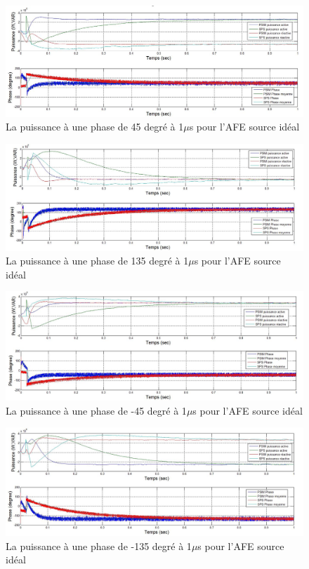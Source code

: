 \documentclass[11pt,letterpaper,final]{report}
\begin{document}
\begin{figure}[htb]
\centering
\includegraphics[scale=0.5]{Fig/AFEIDEAL/pui45.jpg}
\caption{La puissance à une phase de 45 degré à 1$\mu$s pour l'AFE source idéal}
\label{AF_I_pui_45}
\end{figure}

\begin{figure}[htb]
\centering
\includegraphics[scale=0.5]{Fig/AFEIDEAL/pui135.jpg}
\caption{La puissance à une phase de 135 degré à 1$\mu$s pour l'AFE source idéal}
\label{AF_I_pui_135}
\end{figure}

\begin{figure}[htb]
\centering
\includegraphics[scale=0.5]{Fig/AFEIDEAL/pui_45.jpg}
\caption{La puissance à une phase de -45 degré à 1$\mu$s pour l'AFE source idéal}
\label{AF_I_pui__45}
\end{figure}

\begin{figure}[htb]
\centering
\includegraphics[scale=0.5]{Fig/AFEIDEAL/pui_135.jpg}
\caption{La puissance à une phase de -135 degré à 1$\mu$s pour l'AFE source idéal}
\label{AF_I_pui__135}
\end{figure}
\end{document}
